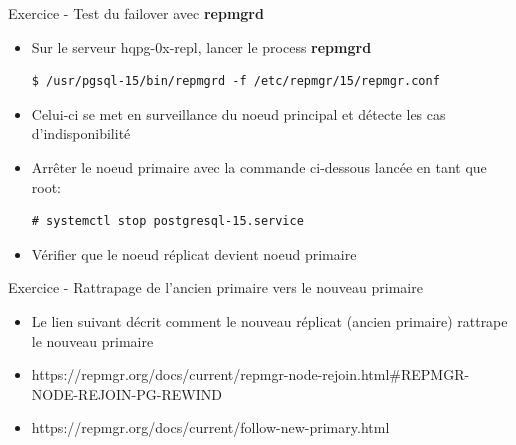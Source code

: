 \begin{frame}[fragile]{Exercice - Test du failover avec \textbf{repmgrd}}

   \begin{itemize}
      \item Sur le serveur hqpg-0x-repl, lancer le process \textbf{repmgrd}
\begin{tiny}
\begin{Verbatim}[commandchars=\&\{\}]
$ /usr/pgsql-15/bin/repmgrd -f /etc/repmgr/15/repmgr.conf
\end{Verbatim}
\end{tiny}
      \item Celui-ci se met en surveillance du noeud principal et détecte les cas d'indisponibilité
      \item Arrêter le noeud primaire avec la commande ci-dessous lancée en tant que root:
\begin{tiny}
\begin{Verbatim}[commandchars=\&\{\}]
# systemctl stop postgresql-15.service
\end{Verbatim}
\end{tiny}
      \item Vérifier que le noeud réplicat devient noeud primaire
   \end{itemize}

\end{frame}


\begin{frame}[fragile]{Exercice - Rattrapage de l'ancien primaire vers le nouveau primaire}

   \begin{itemize}
      \item Le lien suivant décrit comment le nouveau réplicat (ancien primaire) rattrape le nouveau primaire
      \item https://repmgr.org/docs/current/repmgr-node-rejoin.html\#REPMGR-NODE-REJOIN-PG-REWIND
      \item https://repmgr.org/docs/current/follow-new-primary.html
   \end{itemize}

\begin{toile}
\end{toile}

\end{frame}

